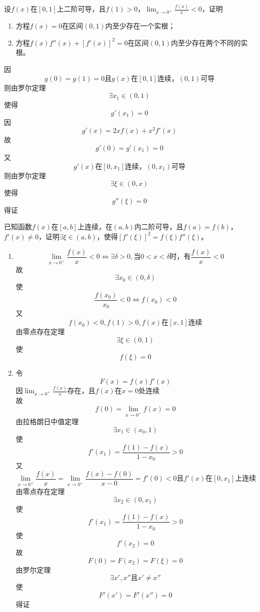\begin{example}
	设$f(x)$在$[0,1]$上二阶可导，且$f(1)>0$，$\lim_{x\to 0^+}\frac{f(x)}{x}<0$，证明
	\begin{enumerate}
		\item 方程$f(x)=0$在区间$(0,1)$内至少存在一个实根；
		\item 方程$f(x)f''(x)+[f'(x)]^2=0$在区间$(0,1)$内至少存在两个不同的实根。
	\end{enumerate}
\end{example}
	\begin{newproof}
		因\[g\left( 0 \right) =g\left( 1 \right) =0\text{且}g\left( x \right) \text{在}\left[ 0,1 \right] \text{连续，}\left( 0,1 \right) \text{可导}\]
		则由罗尔定理\[\exists x_1\in \left( 0,1 \right) \]
		使得\[g'\left( x_1 \right) =0\]
		因\[g'\left( x \right) =2xf\left( x \right) +x^2f'\left( x \right) \]
		故\[g'\left( 0 \right) =g'\left( x_1 \right) =0\]
		又\[g'\left( x \right) \text{在}\left[ 0,x_1 \right] \text{连续，}\left( 0,x_1 \right) \text{可导}\]
		则由罗尔定理\[\exists \xi \in \left( 0,x \right) \]
		使得\[g''\left( \xi \right) =0\]
		得证
	\end{newproof}

\begin{example}
	已知函数$f(x)$在$[a,b]$上连续，在$(a,b)$内二阶可导，且$f(a)=f(b)$，$f'(x)\neq 0$，证明$\exists\xi\in(a,b)$，使得$[f'(\xi)]^2=f(\xi)f''(\xi)$。
\end{example}
	\begin{newproof}
		\begin{enumerate}
			\item \[\lim_{x\rightarrow 0^+} \frac{f\left( x \right)}{x}<0\Longleftrightarrow \exists \delta >0,\text{当}0<x<\delta \text{时，有}\frac{f\left( x \right)}{x}<0\]
			故\[\exists x_0\in \left( 0,\delta \right) \]
			使\[\frac{f\left( x_0 \right)}{x_0}<0\Longleftrightarrow f\left( x_0 \right) <0\]
			又\[f\left( x_0 \right) <0,f\left( 1 \right) >0,f\left( x \right) \text{在}\left[ x,1 \right] \text{连续}\]
			由零点存在定理\[\exists \xi \in \left( 0,1 \right) \]
			使\[f\left( \xi \right) =0\]
			\item 令\[F\left( x \right) =f\left( x \right) f'\left( x \right) \]
			因$\lim_{x\rightarrow 0^+} \frac{f\left( x \right)}{x}\text{存在，且}f\left( x \right) \text{在}x=0\text{处连续}$\\
			故\[f\left( 0 \right) =\lim_{x\rightarrow 0^+} f\left( x \right) =0\]
			由拉格朗日中值定理\[\exists x_1\in \left( x_0,1 \right) \]
			使\[f'\left( x_1 \right) =\frac{f\left( 1 \right) -f\left( x \right)}{1-x_0}>0\]
			又\[\lim_{x\rightarrow 0^+} \frac{f\left( x \right)}{x}=\lim_{x\rightarrow 0^+} \frac{f\left( x \right) -f\left( 0 \right)}{x-0}=f'\left( 0 \right) <0 \text{且}f'\left( x \right) \text{在}\left[ 0,x_1 \right] \text{上连续}\]
			由零点存在定理\[\exists x_2\in \left( 0,x_1 \right) \]
			使\[f'\left( x_1 \right) =\frac{f\left( 1 \right) -f\left( x \right)}{1-x_0}>0\]
			使\[f'\left( x_2 \right) =0\]
			故\[F\left( 0 \right) =F\left( x_2 \right) =F\left( \xi \right) =0\]
			由罗尔定理\[\exists x',x''\text{且}x'\ne x''\]
			使\[F'\left( x' \right) =F'\left( x'' \right) =0\]
			得证
		\end{enumerate}
	\end{newproof}
	

